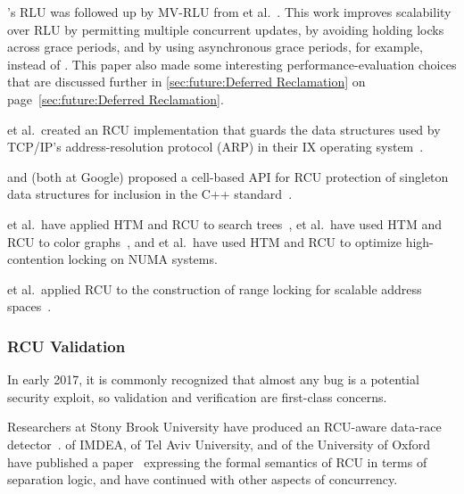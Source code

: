 's RLU was followed up by MV-RLU from
 et al.~\cite{Kim:2019:MSR:3297858.3304040}.
This work improves scalability over RLU by permitting multiple concurrent
updates, by avoiding holding locks across grace periods, and by using
asynchronous grace periods, for example,  instead of
.
This paper also made some interesting performance-evaluation choices that
are discussed further in
\cref{sec:future:Deferred Reclamation}
on
page~\ref{sec:future:Deferred Reclamation}.

 et al.~created an RCU implementation that guards the
data structures used by TCP/IP's address-resolution protocol (ARP)
in their IX operating system~\cite{Belay:2016:IOS:3014162.2997641}.

 and  (both at Google) proposed
a cell-based API for RCU
protection of singleton data structures for inclusion in the
C++ standard~\cite{GeoffRomer2018C++DeferredReclamationP0561R4}.

 et al.~have applied
HTM and RCU to search trees~\cite{Siakavaras2017CombiningHA,DimitriosSiakavaras2020RCU-HTM-B+Trees},
 et al.~have used HTM and RCU to color
graphs~\cite{ChristinaGiannoula2018HTM-RCU-graphcoloring},
and
 et al.~have used HTM and RCU to optimize high-contention
locking on NUMA systems.

 et al.~applied RCU to the construction of range locking
for scalable address spaces~\cite{AlexKogan2020RCUrangelocks}.

\subsubsection{RCU Validation}
\label{sec:defer:RCU Validation}

In early 2017, it is commonly recognized that almost any bug is a potential
security exploit, so validation and verification are first-class concerns.

Researchers at Stony Brook University have produced an RCU-aware data-race
detector~\cite{AbhinavDuggal2010Masters,JustinSeyster2012PhD,Seyster:2011:RFA:2075416.2075425}.
 of IMDEA,  of Tel Aviv University,
and  of the University of Oxford have published a
paper~\cite{AlexeyGotsman2012VerifyGraceExtended} expressing the formal
semantics of RCU in terms of separation logic, and have continued with
other aspects of concurrency.

